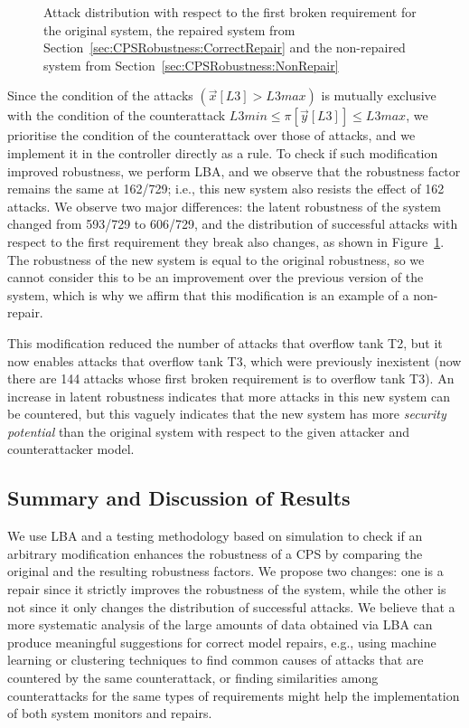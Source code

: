 {\begin{figure}[t]
  \caption{Attack distribution with respect to the first broken requirement for the original system, the repaired system from Section~\ref{sec:CPSRobustness:CorrectRepair} and the non-repaired system from Section~\ref{sec:CPSRobustness:NonRepair}}
  \label{fig:CPSRobustness:AttackDistribution}
\end{figure} 
Since the condition of the attacks $(\vec{x}[L3]>L3max)$ is mutually exclusive with the condition of the counterattack $L3min \leq \pi[\vec{y}[L3]]\leq L3max$, we prioritise the condition of the counterattack over those of attacks, and we implement it in the controller directly as a rule. To check if such modification improved robustness, we perform LBA, and we observe that the robustness factor remains the same at 162/729; i.e., this new system also resists the effect of 162 attacks. We observe two major differences: the latent robustness of the system changed from 593/729 to 606/729, and the distribution of successful attacks with respect to the first requirement they break also changes, as shown in Figure~\ref{fig:CPSRobustness:AttackDistribution}. The robustness of the new system is equal to the original robustness, so we cannot consider this to be an improvement over the previous version of the system, which is why we affirm that this modification is an example of a non-repair. 

This modification reduced the number of attacks that overflow tank T2, but it now enables attacks that overflow tank T3, which were previously inexistent (now there are 144 attacks whose first broken requirement is to overflow tank T3). An increase in latent robustness indicates that more attacks in this new system can be countered, but this vaguely indicates that the new system has more \emph{security potential} than the original system with respect to the given attacker and counterattacker model.



\subsection{Summary and Discussion of Results}
We use LBA and a testing methodology based on simulation to check if an arbitrary modification enhances the robustness of a CPS by comparing the original and the resulting robustness factors. We propose two changes: one is a repair since it strictly improves the robustness of the system, while the other is not since it only changes the distribution of successful attacks. We believe that a more systematic analysis of the large amounts of data obtained via LBA can produce meaningful suggestions for correct model repairs, e.g., using machine learning or clustering techniques to find common causes of attacks that are countered by the same counterattack, or finding similarities among counterattacks for the same types of requirements might help the implementation of both system monitors and repairs. 

}
